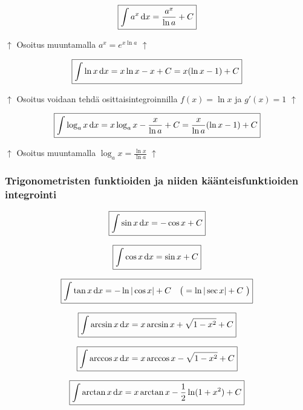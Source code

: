 \documentclass[../integrointiopas.tex]{subfiles}
\begin{document}
	\begin{equation}
		\boxed{\int a^x\odif{x} = \frac{a^x}{\ln a} + C}
	\end{equation}

	$\uparrow$ Osoitus muuntamalla $a^x = e^{x\ln a}$ $\uparrow$

	\begin{equation}
		\boxed{\int \ln x\odif{x} = x\ln x - x + C = x(\ln x - 1) + C}
	\end{equation}

	$\uparrow$ Osoitus voidaan tehdä osittaisintegroinnilla $f(x) = \ln x$ ja $g'(x) = 1$ $\uparrow$

	\begin{equation}
		\boxed{\int \log_{a}x\odif{x} = x\log_{a}x - \frac{x}{\ln a} + C = \frac{x}{\ln a}(\ln x - 1) + C}
	\end{equation}

	$\uparrow$ Osoitus muuntamalla $\log_{a} x = \frac{\ln x}{\ln a}$ $\uparrow$
	
	\subsubsection{Trigonometristen funktioiden ja niiden käänteisfunktioiden integrointi}
	
	\begin{equation}
		\boxed{\int \sin x\odif{x} = -\cos x + C} 
	\end{equation}
	
	\begin{equation}
		\boxed{\int \cos x\odif{x} = \sin x + C}
	\end{equation}

	\begin{equation}
		\boxed{\int \tan x\odif{x} = -\ln|\cos x| + C \ \ \ \big(=\ln|\sec x| + C \ \big) }
	\end{equation}

	\begin{equation}
		\boxed{\int \arcsin x \odif{x} = x\arcsin x + \sqrt{1 - x^2} + C}
	\end{equation}

	\begin{equation}
		\boxed{\int \arccos x \odif{x} = x\arccos x - \sqrt{1 - x^2} + C}
	\end{equation}
	
	\begin{equation}
		\boxed{\int \arctan x \odif{x} = x\arctan x - \frac{1}{2}\ln(1 + x^2) + C}
	\end{equation}
\end{document}
